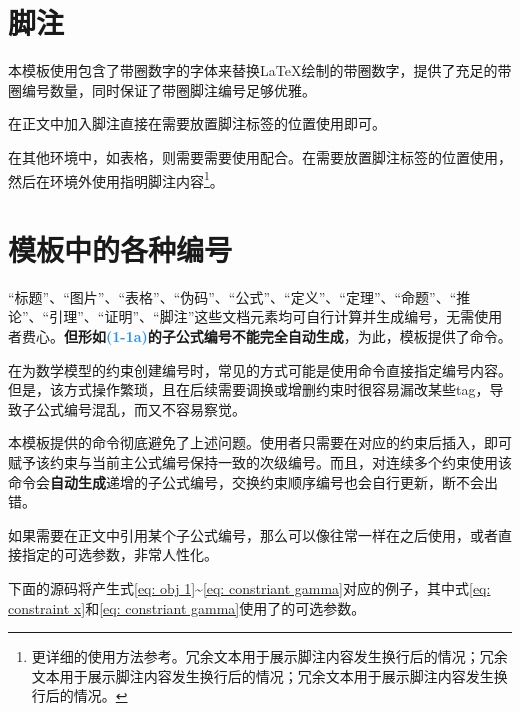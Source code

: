 \newpage

\section{脚注}

本模板使用包含了带圈数字的字体来替换LaTeX绘制的带圈数字，提供了充足的带圈编号数量，同时保证了带圈脚注编号足够优雅。

在正文中加入脚注直接在需要放置脚注标签的位置使用即可。

在其他环境中，如表格，则需要需要使用配合。在需要放置脚注标签的位置使用，然后在环境外使用指明脚注内容\footnote{更详细的使用方法参考\href{https://blog.csdn.net/xovee/article/details/127563209}{\ttfamily\color{DarkRed}}。冗余文本用于展示脚注内容发生换行后的情况；冗余文本用于展示脚注内容发生换行后的情况；冗余文本用于展示脚注内容发生换行后的情况。}。


\section{模板中的各种编号}

“标题”、“图片”、“表格”、“伪码”、“公式”、“定义”、“定理”、“命题”、“推论”、“引理”、“证明”、“脚注”这些文档元素均可自行计算并生成编号，无需使用者费心。\textbf{但形如\textcolor{DodgerBlue}{(1-1a)}的子公式编号不能完全自动生成}，为此，模板提供了命令。

在为数学模型的约束创建编号时，常见的方式可能是使用命令直接指定编号内容。但是，该方式操作繁琐，且在后续需要调换或增删约束时很容易漏改某些tag，导致子公式编号混乱，而又不容易察觉。

本模板提供的命令彻底避免了上述问题。使用者只需要在对应的约束后插入，即可赋予该约束与当前主公式编号保持一致的次级编号。而且，对连续多个约束使用该命令会\textbf{自动生成}递增的子公式编号，交换约束顺序编号也会自行更新，断不会出错。

如果需要在正文中引用某个子公式编号，那么可以像往常一样在之后使用，或者直接指定的可选参数，非常人性化。

下面的源码将产生式\eqref{eq: obj 1}\textasciitilde \eqref{eq: constriant gamma}对应的例子，其中式\eqref{eq: constraint x}和\eqref{eq: constriant gamma}使用了的可选参数。



